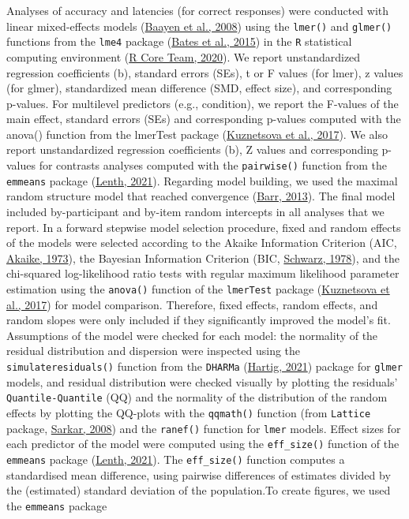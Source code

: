 \documentclass[
  a4paper,12pt,twoside,onecolumn,openright,final,oldfontcommands]{memoir}
\begin{document}
Analyses of accuracy and latencies (for correct responses) were conducted with linear mixed-effects models (\protect\hyperlink{ref-baayen_mixed-effects_2008}{Baayen et al., 2008}) using the \texttt{lmer()} and \texttt{glmer()} functions from the \texttt{lme4} package (\protect\hyperlink{ref-bates_fitting_2015}{Bates et al., 2015}) in the \texttt{R} statistical computing environment (\protect\hyperlink{ref-r_core_team_r_2020}{R Core Team, 2020}). We report unstandardized regression coefficients (b), standard errors (SEs), \textbar t\textbar{} or \textbar F\textbar{} values (for lmer), \textbar z\textbar{} values (for glmer), standardized mean difference (SMD, effect size), and corresponding p-values. For multilevel predictors (e.g., condition), we report the F-values of the main effect, standard errors (SEs) and corresponding p-values computed with the anova() function from the lmerTest package (\protect\hyperlink{ref-kuznetsova_lmertest_2017}{Kuznetsova et al., 2017}). We also report unstandardized regression coefficients (b), \textbar Z\textbar{} values and corresponding p-values for contrasts analyses computed with the \texttt{pairwise()} function from the \texttt{emmeans} package (\protect\hyperlink{ref-lenth_emmeans_2021}{Lenth, 2021}). Regarding model building, we used the maximal random structure model that reached convergence (\protect\hyperlink{ref-barr_random_2013}{Barr, 2013}). The final model included by-participant and by-item random intercepts in all analyses that we report. In a forward stepwise model selection procedure, fixed and random effects of the models were selected according to the Akaike Information Criterion (AIC, \protect\hyperlink{ref-akaike_maximum_1973}{Akaike, 1973}), the Bayesian Information Criterion (BIC, \protect\hyperlink{ref-schwarz_estimating_1978}{Schwarz, 1978}), and the chi-squared log-likelihood ratio tests with regular maximum likelihood parameter estimation using the \texttt{anova()} function of the \texttt{lmerTest} package (\protect\hyperlink{ref-kuznetsova_lmertest_2017}{Kuznetsova et al., 2017}) for model comparison. Therefore, fixed effects, random effects, and random slopes were only included if they significantly improved the model's fit. Assumptions of the model were checked for each model: the normality of the residual distribution and dispersion were inspected using the \texttt{simulateresiduals()} function from the \texttt{DHARMa} (\protect\hyperlink{ref-hartig_dharma_2021}{Hartig, 2021}) package for \texttt{glmer} models, and residual distribution were checked visually by plotting the residuals' \texttt{Quantile-Quantile} (QQ) and the normality of the distribution of the random effects by plotting the QQ-plots with the \texttt{qqmath()} function (from \texttt{Lattice} package, \protect\hyperlink{ref-sarkar_lattice_2008}{Sarkar, 2008}) and the \texttt{ranef()} function for \texttt{lmer} models. Effect sizes for each predictor of the model were computed using the \texttt{eff\_size()} function of the \texttt{emmeans} package (\protect\hyperlink{ref-lenth_emmeans_2021}{Lenth, 2021}). The \texttt{eff\_size()} function computes a standardised mean difference, using pairwise differences of estimates divided by the (estimated) standard deviation of the population.To create figures, we used the \texttt{emmeans} package 
\end{document}
